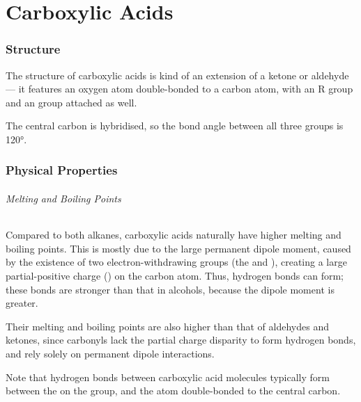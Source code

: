 

\pagebreak
\hypertarget{ChapterCarboxylicAcids}{}
\part{Carboxylic Acids}

	\section{Structure}

		The structure of carboxylic acids is kind of an extension of a ketone or aldehyde --- it features an oxygen atom double-bonded
		to a carbon atom, with an R group and an  group attached as well.


		The central carbon is \sptwo{} hybridised, so the bond angle between all three groups is \ang{120}.


	\section{Physical Properties}

		\paragraph{Melting and Boiling Points}

		Compared to both alkanes, carboxylic acids naturally have higher melting and boiling points. This is mostly due to the large permanent
		dipole moment, caused by the existence of two electron-withdrawing groups (the  and ), creating a large partial-positive
		charge (\deltap) on the carbon atom. Thus, hydrogen bonds can form; these bonds are stronger than that in alcohols, because the dipole
		moment is greater.

		Their melting and boiling points are also higher than that of aldehydes and ketones, since carbonyls lack the  partial charge
		disparity to form hydrogen bonds, and rely solely on permanent dipole interactions.

		Note that hydrogen bonds between carboxylic acid molecules typically form between the  on the  group, and the  atom
		double-bonded to the central carbon.


